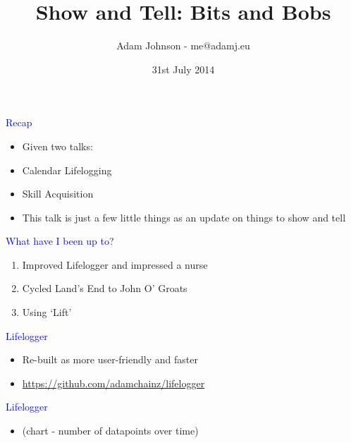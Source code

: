 \documentclass[landscape]{slides}
\title{Show and Tell: Bits and Bobs}
\author{Adam Johnson - me@adamj.eu}
\date{31st July 2014}
\begin{document}
\maketitle


\begin{slide}

    \textcolor{blue}{\Large{Recap}}

    \begin{itemize}
        \item Given two talks:
        \item Calendar Lifelogging
        \item Skill Acquisition
        \item This talk is just a few little things as an update on things to show and tell
    \end{itemize}

\end{slide}


\begin{slide}

    \textcolor{blue}{\Large{What have I been up to?}}

    \begin{enumerate}
        \item Improved Lifelogger and impressed a nurse
        \item Cycled Land's End to John O' Groats
        \item Using `Lift'
    \end{enumerate}

\end{slide}



\begin{slide}

    \textcolor{blue}{\Large{Lifelogger}}

    \begin{itemize}
        \item Re-built as more user-friendly and faster
        \item \url{https://github.com/adamchainz/lifelogger}
    \end{itemize}

\end{slide}


\begin{slide}

    \textcolor{blue}{\Large{Lifelogger}}

    \begin{itemize}
        \item (chart - number of datapoints over time)
    \end{itemize}

\end{slide}
\end{document}
